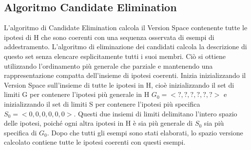 \documentclass{article}
\begin{document}
\subsection{Algoritmo Candidate Elimination}
L'algoritmo di Candidate Elimination calcola il Version Space contenente tutte le ipotesi di H che sono coerenti con una sequenza osservata di esempi di addestramento. L'algoritmo di eliminazione dei candidati calcola la descrizione di questo set senza elencare esplicitamente tutti i suoi membri. Ciò si ottiene utilizzando l'ordinamento più generale che parziale e mantenendo una rappresentazione compatta dell'insieme di ipotesi coerenti. \newline
Inizia inizializzando il Version Space sull'insieme di tutte le ipotesi in H, cioè inizializzando il set di limiti G per contenere l'ipotesi più generale in H $G_0 = <?, ?, ?, ?, ?, ?>$ e inizializzando il set di limiti S per contenere l'ipotesi più specifica $S_0 = <0, 0, 0, 0, 0, 0>$. Questi due insiemi di limiti delimitano l'intero spazio delle ipotesi, poiché ogni altra ipotesi in H è sia più generale di $S_0$ sia più specifica di $G_0$. Dopo che tutti gli esempi sono stati elaborati, lo spazio versione calcolato contiene tutte le ipotesi coerenti con questi esempi.
\end{document}
